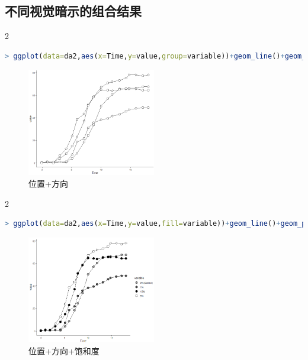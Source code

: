 \documentclass[11pt,a4paper,oneside]{book}
\begin{document}
\subsection{不同视觉暗示的组合结果}
\begin{multicols}{2}
\begin{lstlisting}[language=r]
> ggplot(data=da2,aes(x=Time,y=value,group=variable))+geom_line()+geom_point(shape=21,size=4,color="black",fill="white")+theme_classic()
\end{lstlisting}
\begin{figure}[H]
	\centering
	\includegraphics[width=0.5\textwidth]{screenshot025}
	\caption{位置+方向}
	\label{fig:screenshot025}
\end{figure}
\end{multicols}
\begin{multicols}{2}
\begin{lstlisting}[language=r]
> ggplot(data=da2,aes(x=Time,y=value,fill=variable))+geom_line()+geom_point(shape=21,size=4,color="black")+scale_fill_manual(values = c("grey60","grey30","black","white"))+theme_classic()
\end{lstlisting}
\begin{figure}[H]
	\centering
	\includegraphics[width=0.5\textwidth]{screenshot026}
	\caption{位置+方向+饱和度}
	\label{fig:screenshot026}
\end{figure}
\end{multicols}
\end{document}
